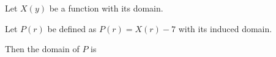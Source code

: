 \documentclass{ximera}
\begin{document}
Let $X(y)$ be a function with its domain.

Let $P(r)$ be defined as $P(r) = X(r)-7$ with its induced domain.

\begin{question}  


Then the domain of $P$ is

\begin{multipleChoice}
\end{multipleChoice}

\end{question}
\end{document}
